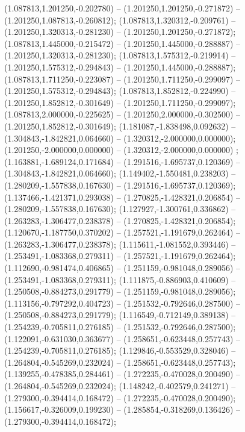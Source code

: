  (1.087813,1.201250,-0.202780) -- (1.201250,1.201250,-0.271872) -- (1.201250,1.087813,-0.260812);
 (1.087813,1.320312,-0.209761) -- (1.201250,1.320313,-0.281230) -- (1.201250,1.201250,-0.271872);
 (1.087813,1.445000,-0.215472) -- (1.201250,1.445000,-0.288887) -- (1.201250,1.320313,-0.281230);
 (1.087813,1.575312,-0.219914) -- (1.201250,1.575312,-0.294843) -- (1.201250,1.445000,-0.288887);
 (1.087813,1.711250,-0.223087) -- (1.201250,1.711250,-0.299097) -- (1.201250,1.575312,-0.294843);
 (1.087813,1.852812,-0.224990) -- (1.201250,1.852812,-0.301649) -- (1.201250,1.711250,-0.299097);
 (1.087813,2.000000,-0.225625) -- (1.201250,2.000000,-0.302500) -- (1.201250,1.852812,-0.301649);
 (1.181087,-1.838498,0.092632) -- (1.304843,-1.842821,0.064660) -- (1.320312,-2.000000,0.000000);
 (1.201250,-2.000000,0.000000) -- (1.320312,-2.000000,0.000000) ;
 (1.163881,-1.689124,0.171684) -- (1.291516,-1.695737,0.120369) -- (1.304843,-1.842821,0.064660);
 (1.149402,-1.550481,0.238203) -- (1.280209,-1.557838,0.167630) -- (1.291516,-1.695737,0.120369);
 (1.137466,-1.421371,0.293038) -- (1.270825,-1.428321,0.206854) -- (1.280209,-1.557838,0.167630);
 (1.127927,-1.300761,0.336862) -- (1.263283,-1.306477,0.238378) -- (1.270825,-1.428321,0.206854);
 (1.120670,-1.187750,0.370202) -- (1.257521,-1.191679,0.262464) -- (1.263283,-1.306477,0.238378);
 (1.115611,-1.081552,0.393446) -- (1.253491,-1.083368,0.279311) -- (1.257521,-1.191679,0.262464);
 (1.112690,-0.981474,0.406865) -- (1.251159,-0.981048,0.289056) -- (1.253491,-1.083368,0.279311);
 (1.111875,-0.886903,0.410609) -- (1.250508,-0.884273,0.291779) -- (1.251159,-0.981048,0.289056);
 (1.113156,-0.797292,0.404723) -- (1.251532,-0.792646,0.287500) -- (1.250508,-0.884273,0.291779);
 (1.116549,-0.712149,0.389138) -- (1.254239,-0.705811,0.276185) -- (1.251532,-0.792646,0.287500);
 (1.122091,-0.631030,0.363677) -- (1.258651,-0.623448,0.257743) -- (1.254239,-0.705811,0.276185);
 (1.129846,-0.553529,0.328046) -- (1.264804,-0.545269,0.232024) -- (1.258651,-0.623448,0.257743);
 (1.139255,-0.478385,0.284461) -- (1.272235,-0.470028,0.200490) -- (1.264804,-0.545269,0.232024);
 (1.148242,-0.402579,0.241271) -- (1.279300,-0.394414,0.168472) -- (1.272235,-0.470028,0.200490);
 (1.156617,-0.326009,0.199230) -- (1.285854,-0.318269,0.136426) -- (1.279300,-0.394414,0.168472);
